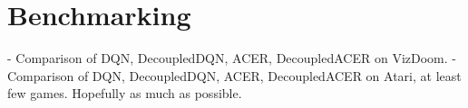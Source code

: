 \section{Benchmarking}

- Comparison of DQN, DecoupledDQN, ACER, DecoupledACER on VizDoom.
- Comparison of DQN, DecoupledDQN, ACER, DecoupledACER on Atari, at least few
  games. Hopefully as much as possible.
